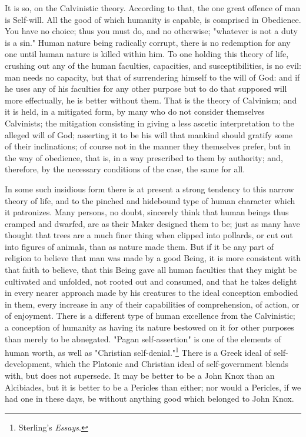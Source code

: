 \documentclass[12pt]{report}
\begin{document}
It is so, on the Calvinistic theory. According to that, the one great offence of man is Self-will. All the good of which humanity is capable, is comprised in Obedience. You have no choice; thus you must do, and no otherwise; "whatever is not a duty is a sin." Human nature being radically corrupt, there is no redemption for any one until human nature is killed within him. To one holding this theory of life, crushing out any of the human faculties, capacities, and susceptibilities, is no evil: man needs no capacity, but that of surrendering himself to the will of God: and if he uses any of his faculties for any other purpose but to do that supposed will more effectually, he is better without them. That is the theory of Calvinism; and it is held, in a mitigated form, by many who do not consider themselves Calvinists; the mitigation consisting in giving a less ascetic interpretation to the alleged will of God; asserting it to be his will that mankind should gratify some of their inclinations; of course not in the manner they themselves prefer, but in the way of obedience, that is, in a way prescribed to them by authority; and, therefore, by the necessary conditions of the case, the same for all.

In some such insidious form there is at present a strong tendency to this narrow theory of life, and to the pinched and hidebound type of human character which it patronizes. Many persons, no doubt, sincerely think that human beings thus cramped and dwarfed, are as their Maker designed them to be; just as many have thought that trees are a much finer thing when clipped into pollards, or cut out into figures of animals, than as nature made them. But if it be any part of religion to believe that man was made by a good Being, it is more consistent with that faith to believe, that this Being gave all human faculties that they might be cultivated and unfolded, not rooted out and consumed, and that he takes delight in every nearer approach made by his creatures to the ideal conception embodied in them, every increase in any of their capabilities of comprehension, of action, or of enjoyment. There is a different type of human excellence from the Calvinistic; a conception of humanity as having its nature bestowed on it for other purposes than merely to be abnegated. "Pagan self-assertion" is one of the elements of human worth, as well as "Christian self-denial."\footnote{Sterling's \emph{Essays}.} There is a Greek ideal of self-development, which the Platonic and Christian ideal of self-government blends with, but does not supersede. It may be better to be a John Knox than an Alcibiades, but it is better to be a Pericles than either; nor would a Pericles, if we had one in these days, be without anything good which belonged to John Knox.
\end{document}
